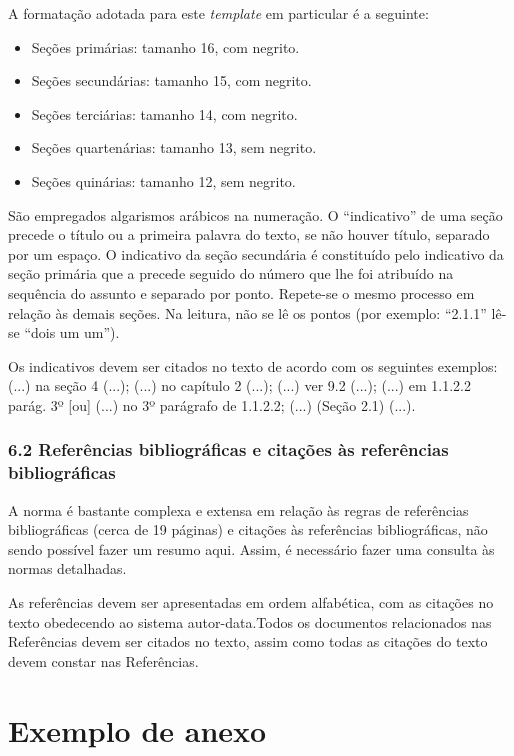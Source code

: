 \documentclass[
	12pt,				%
	oneside,			%
	a4paper,			%
	english,			%
	brazil				%
	]{abntex2ppgsi}
\begin{document}
\begin{anexosenv}
A formatação adotada para este \textit{template} em particular é a seguinte:

\begin{itemize}
	\item Seções primárias: tamanho 16, com negrito.
	\item Seções secundárias: tamanho 15, com negrito.
	\item Seções terciárias: tamanho 14, com negrito.
	\item Seções quartenárias: tamanho 13, sem negrito.
	\item Seções quinárias: tamanho 12, sem negrito.
\end{itemize}

São empregados algarismos arábicos na numeração. O ``indicativo'' de uma seção precede o título ou a primeira palavra do texto, se não houver título, separado por um espaço. O indicativo da seção secundária é constituído pelo indicativo da seção primária que a precede seguido do número que lhe foi atribuído na sequência do assunto e separado por ponto. Repete-se o mesmo processo em relação às demais seções. Na leitura, não se lê os pontos (por exemplo: ``2.1.1'' lê-se ``dois um um'').

Os indicativos devem ser citados no texto de acordo com os seguintes exemplos: (...) na seção 4 (...); (...) no capítulo 2 (...); (...) ver 9.2 (...); (...) em 1.1.2.2 parág. 3º [ou] (...) no 3º parágrafo de 1.1.2.2; (...) (Seção 2.1) (...).

\subsection*{6.2 Referências bibliográficas e citações às referências bibliográficas}

A norma é bastante complexa e extensa em relação às regras de referências bibliográficas (cerca de 19 páginas) e citações às referências bibliográficas, não sendo possível fazer um resumo aqui. Assim, é necessário fazer uma consulta às normas detalhadas.

As referências devem ser apresentadas em ordem alfabética, com as citações no texto obedecendo ao sistema autor-data.Todos os documentos relacionados nas Referências devem ser citados no texto, assim como todas as citações do texto devem constar nas Referências.

\chapter{Exemplo de anexo}


\end{anexosenv}
\end{document}

